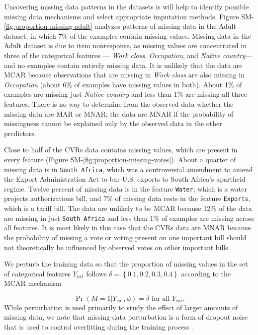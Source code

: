 \documentclass[10pt]{book}
\theoremstyle{definition}
\begin{document}
\par
{}

Uncovering missing data patterns in the datasets is will help to identify possible missing data mechanisms and select appropriate imputation methods. Figure SM-\ref{fig:proportion-missing-adult} analyzes patterns of missing data in the Adult dataset, in which 7\% of the examples contain missing values. Missing data in the Adult dataset is due to item nonresponse, as missing values are concentrated in three of the categorical features --- \emph{Work class}, \emph{Occupation}, and \emph{Native country}--- and no examples contain entirely missing data. It is unlikely that the data are MCAR because observations that are missing in \emph{Work class} are also missing in \emph{Occupation} (about 6\% of examples have missing values in both). About 1\% of examples are missing just \emph{Native country} and less than 1\% are missing all three features. There is no way to determine from the observed data whether the missing data are MAR or MNAR; the data are MNAR if the probability of missingness cannot be explained only by the observed data in the other predictors.

Close to half of the CVRs data contains missing values, which are present in every feature (Figure SM-\ref{fig:proportion-missing-votes}). About a quarter of missing data is in \texttt{South Africa}, which was a controversial amendment to amend the Export Administration Act to bar U.S. exports to South Africa's apartheid regime. Twelve percent of missing data is in the feature \texttt{Water}, which is a water projects authorizations bill, and 7\% of missing data rests in the feature \texttt{Exports}, which is a tariff bill. The data are unlikely to be MCAR because 12\% of the data are missing in just \texttt{South Africa} and less than 1\% of examples are missing across all features. It is most likely in this case that the CVRs data are MNAR because the probability of missing a vote or voting present on one important bill should not theoretically be influenced by observed votes on other important bills. 

\par
{}

We perturb the training data so that the proportion of missing values in the set of categorical features $Y_{\mathrm{cat}}$ follows $\delta = \left\{0.1, 0.2, 0.3, 0.4\right\}$ according to the MCAR mechanism
 
 \begin{equation}\label{3.1}
\Pr (M = 1 | Y_{\mathrm{cat}}, \phi) = \delta \text{ for all } Y_{\mathrm{cat}}.
\end{equation} While perturbation is used primarily to study the effect of larger amounts of missing data, we note that missing-data perturbation is a form of dropout noise that is used to control overfitting during the training process \citep{wager2013}.
\end{document}
